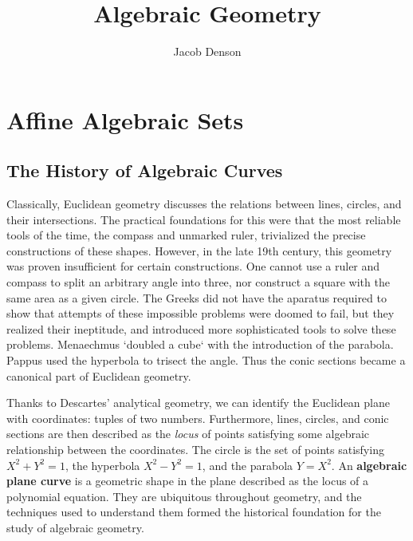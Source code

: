

\title{Algebraic Geometry}
\author{Jacob Denson}



\maketitle
\tableofcontents
{}

\chapter{Affine Algebraic Sets}

\section{The History of Algebraic Curves}

Classically, Euclidean geometry discusses the relations between lines, circles, and their intersections. The practical foundations for this were that the most reliable tools of the time, the compass and unmarked ruler, trivialized the precise constructions of these shapes. However, in the late 19th century, this geometry was proven insufficient for certain constructions. One cannot use a ruler and compass to split an arbitrary angle into three, nor construct a square with the same area as a given circle. The Greeks did not have the aparatus required to show that attempts of these impossible problems were doomed to fail, but they realized their ineptitude, and introduced more sophisticated tools to solve these problems. Menaechmus `doubled a cube` with the introduction of the parabola. Pappus used the hyperbola to trisect the angle. Thus the conic sections became a canonical part of Euclidean geometry.

Thanks to Descartes' analytical geometry, we can identify the Euclidean plane with coordinates: tuples of two numbers. Furthermore, lines, circles, and conic sections are then described as the {\it locus} of points satisfying some algebraic relationship between the coordinates. The circle is the set of points satisfying $X^2 + Y^2 = 1$, the hyperbola $X^2 - Y^2 = 1$, and the parabola $Y = X^2$. An {\bf algebraic plane curve} is a geometric shape in the plane described as the locus of a polynomial equation. They are ubiquitous throughout geometry, and the techniques used to understand them formed the historical foundation for the study of algebraic geometry.

